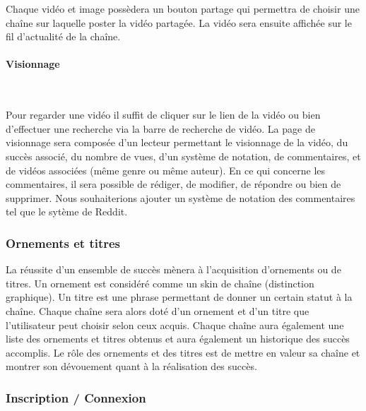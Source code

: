 \documentclass[a4paper,10pt]{article}
\begin{document}
Chaque vidéo et image possèdera un bouton partage qui permettra de choisir une chaîne sur laquelle poster la vidéo partagée. La vidéo sera ensuite affichée sur le fil d'actualité de la chaîne. 

\paragraph{Visionnage}~\

Pour regarder une vidéo il suffit de cliquer sur le lien de la vidéo ou bien d'effectuer une recherche via la barre de recherche de vidéo. La page de visionnage sera composée d'un lecteur permettant le visionnage de la vidéo, du succès associé, du nombre de vues, d'un système de notation, de commentaires, et de vidéos associées (même genre ou même auteur).
En ce qui concerne les commentaires, il sera possible de rédiger, de modifier, de répondre ou bien de supprimer. Nous souhaiterions ajouter un système de notation des commentaires tel que le sytème de Reddit.

\subsubsection{Ornements et titres}

La réussite d'un ensemble de succès mènera à l'acquisition d'ornements ou de titres. Un ornement est considéré comme un skin de chaîne (distinction graphique). Un titre est une phrase permettant de donner un certain statut à la chaîne. Chaque chaîne sera alors doté d'un ornement et d'un titre que l'utilisateur peut choisir selon ceux acquis. Chaque chaîne aura également une liste des ornements et titres obtenus et aura également un historique des succès accomplis. Le rôle des ornements et des titres est de mettre en valeur sa chaîne et montrer son dévouement quant à la réalisation des succès.

\subsubsection{Inscription / Connexion}
\end{document}
